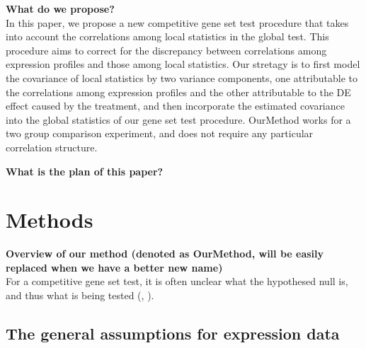 \documentclass[11pt, a4paper]{article}
\begin{document}
	   
	
	\textbf{What do we propose?} \\
	In this paper, we propose a new competitive gene set test procedure that takes into account the correlations among local statistics in the global test. This procedure aims to correct for the discrepancy between correlations among expression profiles and those among local statistics. Our stretagy is to first model the covariance of local statistics by two variance components, one attributable to the correlations among expression profiles and the other attributable to the DE effect caused by the treatment, and then incorporate the estimated covariance into the global statistics of our gene set test procedure. OurMethod works for a two group comparison experiment, and does not require any particular correlation structure. 
		
	\textbf{What is the plan of this paper?} \\
	\section{Methods}\label{section:methods}
	\textbf{Overview of our method (denoted as OurMethod, will be easily replaced when we have a better new name)} \\
	For a competitive gene set test, it is often unclear what the hypothesed null is, and thus what is being tested (\citealp{barry2008statistical},  \citealp{wu2012camera}).
	
	\subsection{The general assumptions for expression data}\label{subsection:assumption}
\end{document}
